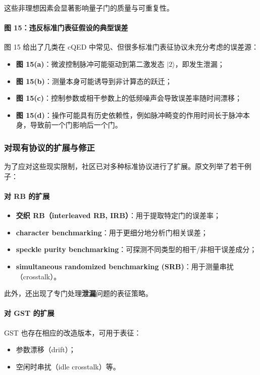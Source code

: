 \documentclass[12pt,a4paper,oneside]{ctexbook}
\begin{document}
这些非理想因素会显著影响量子门的质量与可重复性。

\paragraph{图 15：违反标准门表征假设的典型误差}
图 15 给出了几类在 cQED 中常见、但很多标准门表征协议未充分考虑的误差源：
\begin{itemize}
    \item \textbf{图 15(a)}：微波控制脉冲可能驱动到第二激发态 \(|2\rangle\)，即发生泄漏；
    \item \textbf{图 15(b)}：测量本身可能诱导到非计算态的跃迁；
    \item \textbf{图 15(c)}：控制参数或相干参数上的低频噪声会导致误差率随时间漂移；
    \item \textbf{图 15(d)}：操作可能具有历史依赖性，例如脉冲畸变的作用时间长于脉冲本身，导致前一个门影响后一个门。
\end{itemize}

\subsubsection{对现有协议的扩展与修正}

为了应对这些现实限制，社区已对多种标准协议进行了扩展。原文列举了若干例子：

\paragraph{对 RB 的扩展}
\begin{itemize}
    \item \textbf{交织 RB（interleaved RB, IRB）}：用于提取特定门的误差率；
    \item \textbf{character benchmarking}：用于更细分地分析门相关误差；
    \item \textbf{speckle purity benchmarking}：可探测不同类型的相干/非相干误差成分；
    \item \textbf{simultaneous randomized benchmarking (SRB)}：用于测量串扰（crosstalk）。
\end{itemize}

此外，还出现了专门处理\textbf{泄漏}问题的表征策略。

\paragraph{对 GST 的扩展}
GST 也存在相应的改造版本，可用于表征：
\begin{itemize}
    \item 参数漂移（drift）；
    \item 空闲时串扰（idle crosstalk）等。
\end{itemize}
\end{document}
